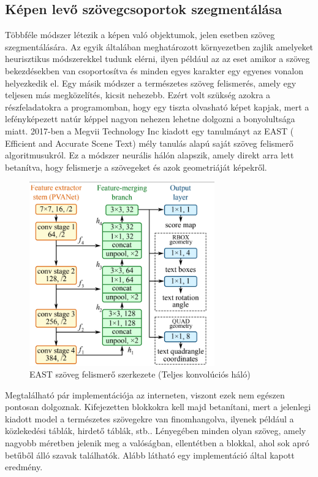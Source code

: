 \documentclass[a4paper,12pt]{article}
\begin{document}
\subsection{Képen levő szövegcsoportok szegmentálása}
Többféle módszer létezik a képen való objektumok, jelen esetben szöveg szegmentálására. Az egyik általában meghatározott környezetben zajlik amelyeket heurisztikus módszerekkel tudunk elérni, ilyen például az az eset amikor a szöveg bekezdésekben van csoportosítva és minden egyes karakter egy egyenes vonalon helyezkedik el. Egy másik módszer a természetes szöveg felismerés, amely egy teljesen más megközelítés, kicsit nehezebb. Ezért volt szükség  azokra a részfeladatokra a programomban, hogy egy tiszta olvasható képet kapjak, mert a lefényképezett natúr képpel nagyon nehezen lehetne dolgozni a bonyolultsága miatt. 2017-ben a Megvii Technology Inc kiadott egy tanulmányt az EAST ( Efficient and Accurate Scene Text)\cite{e} mély tanulás alapú saját szöveg felismerő algoritmusukról. Ez a módszer neurális hálón alapszik, amely direkt arra lett betanítva, hogy felismerje a szövegeket és azok geometriáját képekről. 
\begin{figure}[h]
	\centering
	\includegraphics[width=8cm]{east}
	\caption{EAST szöveg felismerő szerkezete (Teljes konvolúciós háló)\cite{east}}
\end{figure}
Megtalálható pár implementációja az interneten, viszont ezek nem egészen pontosan dolgoznak. Kifejezetten blokkokra kell majd betanítani, mert a jelenlegi kiadott model a természetes szövegekre van finomhangolva, ilyenek például a közlekedési táblák, hirdető táblák, stb.. Lényegében minden olyan szöveg, amely nagyobb méretben jelenik meg a valóságban, ellentétben a blokkal, ahol sok apró betűből álló szavak találhatók. Alább látható egy implementáció által kapott eredmény.
\end{document}
